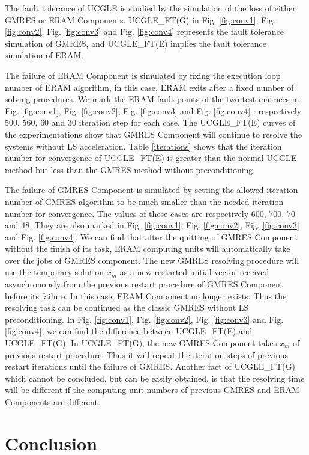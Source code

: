 The fault tolerance of UCGLE is studied by the simulation of the loss of either GMRES or ERAM Components. UCGLE\_FT(G) in Fig. \ref{fig:conv1}, Fig. \ref{fig:conv2}, Fig. \ref{fig:conv3} and Fig. \ref{fig:conv4} represents the fault tolerance simulation of GMRES, and UCGLE\_FT(E) implies the fault tolerance simulation of ERAM. 

The failure of ERAM Component is simulated by fixing the execution loop number of ERAM algorithm, in this case, ERAM exits after a fixed number of solving procedures. We mark the ERAM fault points of the two test matrices in Fig. \ref{fig:conv1}, Fig. \ref{fig:conv2},  Fig. \ref{fig:conv3} and Fig. \ref{fig:conv4} : respectively $500$, $560$, $60$ and $30$ iteration step for each case. The UCGLE\_FT(E) curves of the experimentations show that GMRES Component will continue to resolve the systems without LS acceleration. Table \ref{iterations} shows that the iteration number for convergence of UCGLE\_FT(E) is greater than the normal UCGLE method but less than the GMRES method without preconditioning.

The failure of GMRES Component is simulated by setting the allowed iteration number of GMRES algorithm to be much smaller than the needed iteration number for convergence. The values of these cases are respectively $600$, $700$, $70$ and $48$. They are also marked in Fig. \ref{fig:conv1}, Fig. \ref{fig:conv2}, Fig. \ref{fig:conv3} and Fig. \ref{fig:conv4}. We can find that after the quitting of GMRES Component without the finish of its task, ERAM computing units will automatically take over the jobs of GMRES component. The new GMRES resolving procedure will use the temporary solution $x_m$ as a new restarted initial vector received asynchronously from the previous restart procedure of GMRES Component before its failure. In this case, ERAM Component no longer exists. Thus the resolving task can be continued as the classic GMRES without LS preconditioning. In  Fig. \ref{fig:conv1}, Fig. \ref{fig:conv2}, Fig. \ref{fig:conv3} and Fig. \ref{fig:conv4}, we can find the difference between UCGLE\_FT(E) and UCGLE\_FT(G). In UCGLE\_FT(G), the new GMRES Component takes $x_m$ of previous restart procedure. Thus it will repeat the iteration steps of previous restart iterations until the failure of GMRES. Another fact of UCGLE\_FT(G) which cannot be concluded, but can be easily obtained, is that the resolving time will be different if the computing unit numbers of previous GMRES and ERAM Components are different.


\section{Conclusion}

\clearemptydoublepage